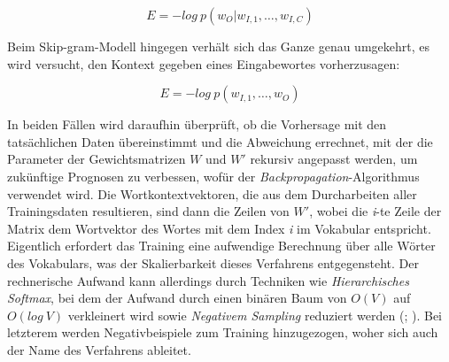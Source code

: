 \begin{equation}
  E = - log\ p(w_O | w_{I,1}, \ldots, w_{I,C})
\end{equation}

Beim Skip-gram-Modell hingegen verhält sich das Ganze genau umgekehrt, es wird versucht, den Kontext gegeben eines Eingabewortes
vorherzusagen:

\begin{equation}
  E = - log\ p(w_{I,1}, \ldots, w_O)
\end{equation}

In beiden Fällen wird daraufhin überprüft, ob die Vorhersage mit den tatsächlichen Daten übereinstimmt und die Abweichung
errechnet, mit der die Parameter der Gewichtsmatrizen $W$ und $W'$ rekursiv angepasst werden, um zukünftige Prognosen
zu verbessen, wofür der \emph{Backpropagation}-Algorithmus verwendet wird. Die Wortkontextvektoren, die aus dem Durcharbeiten aller Trainingsdaten resultieren, sind dann die Zeilen von
$W'$, wobei die \emph{i}-te Zeile der Matrix dem Wortvektor des Wortes mit dem Index \emph{i} im Vokabular entspricht.\\

Eigentlich erfordert das Training eine aufwendige Berechnung über alle Wörter des Vokabulars, was der Skalierbarkeit dieses
Verfahrens entgegensteht. Der rechnerische Aufwand kann allerdings durch Techniken wie \emph{Hierarchisches Softmax}, bei dem
der Aufwand durch einen binären Baum von $O(V)$ auf $O(log\ V)$ verkleinert wird sowie
\emph{Negativem Sampling} reduziert werden (\cite{rong2014word2vec}; \cite{goldberg2014word2vec}).
Bei letzterem werden Negativbeispiele zum Training hinzugezogen, woher sich auch der Name des Verfahrens ableitet.\\

%

